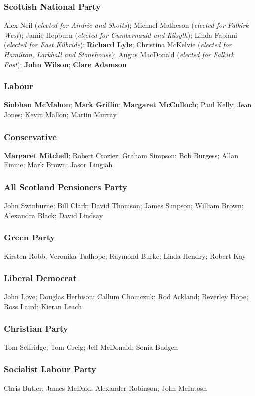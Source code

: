 \begin{resultsiii}
\subsubsection*{Scottish National Party}
Alex Neil (\emph{elected for Airdrie and Shotts}); Michael Matheson (\emph{elected for Falkirk West}); Jamie Hepburn (\emph{elected for Cumbernauld and Kilsyth}); Linda Fabiani (\emph{elected for East Kilbride}); \textbf{Richard Lyle}; Christina McKelvie (\emph{elected for Hamilton, Larkhall and Stonehouse}); Angus MacDonald (\emph{elected for Falkirk East}); \textbf{John Wilson}; \textbf{Clare Adamson}
\subsubsection*{Labour}
\textbf{Siobhan McMahon}; \textbf{Mark Griffin}; \textbf{Margaret McCulloch}; Paul Kelly; Jean Jones; Kevin Mallon; Martin Murray
\subsubsection*{Conservative}
\textbf{Margaret Mitchell}; Robert Crozier; Graham Simpson; Bob Burgess; Allan Finnie; Mark Brown; Jason Lingiah
\subsubsection*{All Scotland Pensioners Party}
John Swinburne; Bill Clark; David Thomson; James Simpson; William Brown; Alexandra Black; David Lindsay
\subsubsection*{Green Party}
Kirsten Robb; Veronika Tudhope; Raymond Burke; Linda Hendry; Robert Kay
\subsubsection*{Liberal Democrat}
John Love; Douglas Herbison; Callum Chomczuk; Rod Ackland; Beverley Hope; Ross Laird; Kieran Leach
\subsubsection*{Christian Party}
Tom Selfridge; Tom Greig; Jeff McDonald; Sonia Budgen
\subsubsection*{Socialist Labour Party}
Chris Butler; James McDaid; Alexander Robinson; John McIntosh

\end{resultsiii}
